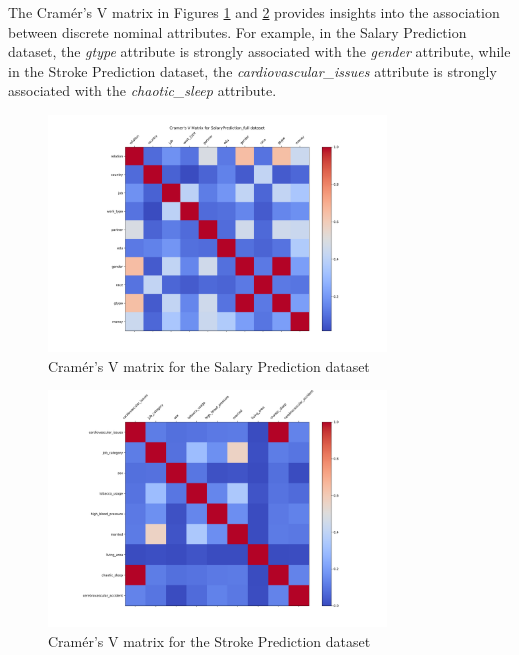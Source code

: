 \documentclass[runningheads]{paper}
\begin{document}
The Cramér's V matrix in Figures \ref{fig:cramer_v_matrix_example_salary} and
\ref{fig:cramer_v_matrix_example_stroke} provides insights into the association
between discrete nominal attributes. For example, in the Salary Prediction dataset,
the \textit{gtype} attribute is strongly associated with the \textit{gender} attribute,
while in the Stroke Prediction dataset, the \textit{cardiovascular\_issues} attribute is strongly
associated with the \textit{chaotic\_sleep} attribute.

\begin{figure}[H]
    \centering
    \includegraphics[width=0.8\textwidth]{../plots/cramer_v_matrix_SalaryPrediction_full.png}
    \caption{Cramér's V matrix for the Salary Prediction dataset}
    \label{fig:cramer_v_matrix_example_salary}
\end{figure}

\begin{figure}[H]
    \centering
    \includegraphics[width=0.8\textwidth]{../plots/cramer_v_matrix_AVC_full.png}
    \caption{Cramér's V matrix for the Stroke Prediction dataset}
    \label{fig:cramer_v_matrix_example_stroke}
\end{figure}
\end{document}
